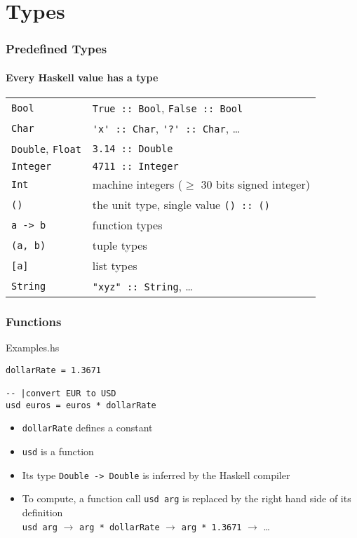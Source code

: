 \documentclass{beamer}
\begin{document}
\section{Types}
\begin{frame}[fragile]
  \frametitle{Predefined Types}
  \framesubtitle{Every Haskell value has a type}
  \begin{center}
    \begin{tabular}{l@{ --- }l}
      \texttt{Bool}
      & \lstinline|True :: Bool|, \lstinline|False :: Bool| \\
      \texttt{Char}
      &\lstinline|'x' :: Char|, \lstinline|'?' :: Char|, \dots\\
      \texttt{Double}, \texttt{Float}
      & \lstinline|3.14 :: Double| \\
      \texttt{Integer}
      & \lstinline|4711 :: Integer| \\
      \texttt{Int}
      &machine integers ($\ge$ 30 bits signed integer) \\
      \texttt{()}
      & the \alert{unit type}, single value \lstinline|() :: ()| \\
      \lstinline|a -> b|
      & function types \\
      \lstinline|(a, b)|
      &tuple types \\
      \lstinline|[a]|
      &list types \\
      \lstinline|String|
      &  \lstinline|"xyz" :: String|, \dots
    \end{tabular}
  \end{center}
\end{frame}
\begin{frame}[fragile]
  \frametitle{Functions}
\begin{block}{Examples.hs}
\begin{lstlisting}
dollarRate = 1.3671

-- |convert EUR to USD
usd euros = euros * dollarRate
\end{lstlisting}
  \end{block}
  \begin{itemize}
  \item \lstinline{dollarRate} defines a constant
  \item \lstinline{usd} is a function 
  \item Its type \lstinline{Double -> Double} is \alert{inferred} by
    the Haskell compiler
  \item To compute, a function call \lstinline{usd arg} is replaced by
    the right hand side of its definition\\
    \lstinline{usd arg} $\rightarrow$ \lstinline{arg * dollarRate}
    $\rightarrow$ \lstinline{arg * 1.3671} $\rightarrow$ \dots
  \end{itemize}
\end{frame}
\end{document}
